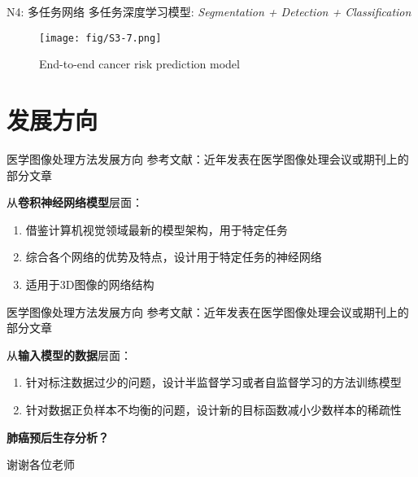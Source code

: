 \documentclass[10pt]{beamer}
\begin{document}
\begin{frame}{N4: 多任务网络}
  多任务深度学习模型: \textit{Segmentation + Detection + Classification}
  \begin{figure}
    \centering
    \texttt{[image: fig/S3-7.png]}
    \caption{End-to-end cancer risk prediction model}
  \end{figure}
\end{frame}

\section{发展方向}

\begin{frame}{医学图像处理方法发展方向}
  参考文献：近年发表在医学图像处理会议或期刊上的部分文章
  \vspace{5 mm}

  从\textbf{卷积神经网络模型}层面：
  \begin{enumerate}[(1)]
    \item 借鉴计算机视觉领域最新的模型架构，用于特定任务
    \item 综合各个网络的优势及特点，设计用于特定任务的神经网络
    \item 适用于3D图像的网络结构
  \end{enumerate}

\end{frame}

\begin{frame}{医学图像处理方法发展方向}
  参考文献：近年发表在医学图像处理会议或期刊上的部分文章
  \vspace{5 mm}

  从\textbf{输入模型的数据}层面：
  \begin{enumerate}[(1)]
    \item 针对标注数据过少的问题，设计半监督学习或者自监督学习的方法训练模型
    \item 针对数据正负样本不均衡的问题，设计新的目标函数减小少数样本的稀疏性
  \end{enumerate}

  \textbf{肺癌预后生存分析？}
\end{frame}

\begin{frame}[standout]
  谢谢各位老师
\end{frame}
\end{document}
